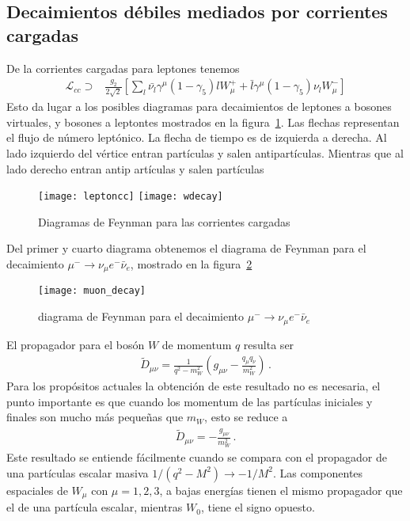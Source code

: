 \subsection{Decaimientos débiles mediados por corrientes cargadas}
\label{sec:deca-debil-medi}
\begin{frame}
De la corrientes cargadas para leptones tenemos
\begin{align}
  \mathcal{L}_{cc}\supset&\frac{g_2}{2\sqrt{2}}\left[\sum_l\bar{\nu_l}\gamma^\mu(1-\gamma_5)l W_\mu^++\bar{l}\gamma^\mu(1-\gamma_5)\nu_l W_\mu^-\right]
\end{align}
Esto da lugar a los posibles diagramas para decaimientos de leptones a bosones virtuales, y bosones a leptontes mostrados en la figura~\ref{fig:leptoncc}. Las flechas representan el flujo de número leptónico. La flecha de tiempo es de izquierda a derecha. Al lado izquierdo del vértice entran partículas y salen antipartículas. Mientras que al lado derecho entran antip artículas y salen partículas
\begin{figure}
  \centering
  \texttt{[image: leptoncc]}
\qquad  \texttt{[image: wdecay]}

  \caption{Diagramas de Feynman para las corrientes cargadas}
  \label{fig:leptoncc}
\end{figure}
Del primer y cuarto diagrama obtenemos el diagrama de Feynman para el decaimiento $\mu^-\to \nu_\mu e^-\bar{\nu}_e$, mostrado en la figura~\ref{fig:muondecay}
\begin{figure}
  \centering
  \texttt{[image: muon\_decay]}
  \caption{diagrama de Feynman para el decaimiento $\mu^-\to \nu_\mu e^-\bar{\nu}_e$}
  \label{fig:muondecay}
\end{figure}
El propagador para el bosón $W$ de momentum $q$ resulta ser
\begin{align}
  \widetilde{D}_{\mu\nu}=\frac{1}{q^2-m_W^2}\left(g_{\mu\nu}-\frac{q_\mu q_\nu}{m_W^2}\right)\,.
\end{align}
Para los propósitos actuales la obtención de este resultado no es necesaria, el punto importante es que cuando los momentum de las partículas iniciales y finales son mucho más pequeñas que $m_W$, esto se reduce a
\begin{align}
  \widetilde{D}_{\mu\nu}=-\frac{g_{\mu\nu}}{m_W^2}\,.
\end{align}
Este resultado se entiende fácilmente cuando se compara con el propagador de una partículas escalar masiva $1/(q^2-M^2)\to-1/M^2$. Las componentes espaciales de $W_\mu$ con $\mu=1,2,3$, a bajas energías tienen el mismo propagador que el de una partícula escalar, mientras $W_0$, tiene el signo opuesto.


\end{frame}
